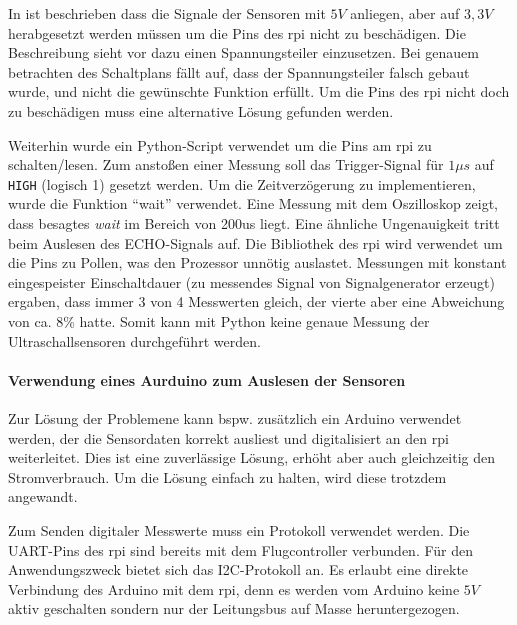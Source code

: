 In \cite[Kapitel 4.3.9]{wirthErweiterungBestehendenDrohne2022} ist beschrieben dass die Signale der Sensoren mit $5V$ anliegen, aber auf $3,3V$ herabgesetzt werden müssen um die Pins des \gls{rpi} nicht zu beschädigen.
Die Beschreibung sieht vor dazu einen Spannungsteiler einzusetzen. Bei genauem betrachten des Schaltplans fällt auf, dass der Spannungsteiler falsch gebaut wurde, und nicht die gewünschte Funktion erfüllt. Um die Pins des \gls{rpi} nicht doch zu beschädigen muss eine alternative Lösung gefunden werden. 

Weiterhin wurde ein Python-Script verwendet um die Pins am \gls{rpi} zu schalten/lesen. 
Zum anstoßen einer Messung soll das Trigger-Signal für $1\mu s$ auf \texttt{HIGH} (logisch 1) gesetzt werden. Um die Zeitverzögerung zu implementieren, wurde die Funktion \enquote{wait} verwendet. Eine Messung mit dem Oszilloskop zeigt, dass besagtes \textit{wait} im Bereich von 200us liegt.\newline
Eine ähnliche Ungenauigkeit tritt beim Auslesen des ECHO-Signals auf. Die Bibliothek des \gls{rpi} wird verwendet um die Pins zu Pollen, was den Prozessor unnötig auslastet. Messungen mit konstant eingespeister Einschaltdauer (zu messendes Signal von Signalgenerator erzeugt) ergaben, dass immer 3 von 4 Messwerten gleich, der vierte aber eine Abweichung von ca. 8\% hatte.\newline
Somit kann mit Python keine genaue Messung der Ultraschallsensoren durchgeführt werden. 

\paragraph*{Verwendung eines Aurduino zum Auslesen der Sensoren}
Zur Lösung der Problemene kann bspw. zusätzlich ein Arduino verwendet werden, der die Sensordaten korrekt ausliest und digitalisiert an den \gls{rpi} weiterleitet. Dies ist eine zuverlässige Lösung, erhöht aber auch gleichzeitig den Stromverbrauch. Um die Lösung einfach zu halten, wird diese trotzdem angewandt.

Zum Senden digitaler Messwerte muss ein Protokoll verwendet werden. Die UART-Pins des \gls{rpi} sind bereits mit dem Flugcontroller verbunden. Für den Anwendungszweck bietet sich das I2C-Protokoll an. Es erlaubt eine direkte Verbindung des Arduino mit dem \gls{rpi}, denn es werden vom Arduino keine $5V$ aktiv geschalten sondern nur der Leitungsbus auf Masse heruntergezogen.

